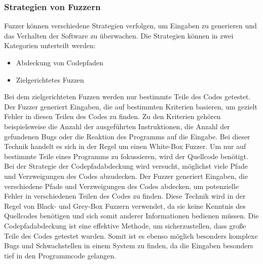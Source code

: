 

\subsubsection{Strategien von Fuzzern}\label{subsubsec:strategien-von-fuzzern}
Fuzzer können verschiedene Strategien verfolgen, um Eingaben zu generieren und das Verhalten der Software zu überwachen.
Die Strategien können in zwei Kategorien unterteilt werden:
\begin{itemize}
    \item Abdeckung von Codepfaden
    \item Zielgerichtetes Fuzzen
\end{itemize}
Bei dem zielgerichteten Fuzzen werden nur bestimmte Teile des Codes getestet.
Der Fuzzer generiert Eingaben, die auf bestimmten Kriterien basieren, um gezielt Fehler in diesen Teilen des Codes zu finden.
Zu den Kriterien gehören beispielsweise die Anzahl der ausgeführten Instruktionen, die Anzahl der gefundenen Bugs oder die Reaktion des Programms auf die Eingabe.
Bei dieser Technik handelt es sich in der Regel um einen White-Box Fuzzer.
Um nur auf bestimmte Teile eines Programms zu fokussieren, wird der Quellcode benötigt.\newline\newline
Bei der Strategie der Codepfadabdeckung wird versucht, möglichst viele Pfade und Verzweigungen des Codes abzudecken.
Der Fuzzer generiert Eingaben, die verschiedene Pfade und Verzweigungen des Codes abdecken, um potenzielle Fehler in verschiedenen
Teilen des Codes zu finden.
Diese Technik wird in der Regel von Black- und Grey-Box Fuzzern verwendet, da sie keine Kenntnis des Quellcodes benötigen und sich
somit anderer Informationen bedienen müssen.
Die Codepfadabdeckung ist eine effektive Methode, um sicherzustellen, dass große Teile des Codes getestet wurden.
Somit ist es ebenso möglich besonders komplexe Bugs und Schwachstellen in einem System zu finden, da die Eingaben besonders
tief in den Programmcode gelangen.